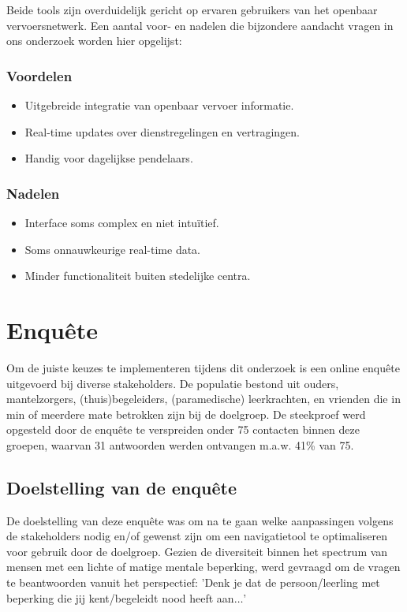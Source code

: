 Beide tools zijn overduidelijk gericht op ervaren gebruikers van het openbaar vervoersnetwerk. Een aantal voor- en nadelen die bijzondere aandacht vragen in ons onderzoek worden hier opgelijst:

\subsubsection*{Voordelen}
\begin{itemize}
    \item Uitgebreide integratie van openbaar vervoer informatie.
    \item Real-time updates over dienstregelingen en vertragingen.
    \item Handig voor dagelijkse pendelaars.
\end{itemize}
\subsubsection*{Nadelen}
\begin{itemize}
    \item Interface soms complex en niet intuïtief.
    \item Soms onnauwkeurige real-time data.
    \item Minder functionaliteit buiten stedelijke centra.
\end{itemize}

\section{Enquête}
\label{sec:enquete}


Om de juiste keuzes te implementeren tijdens dit onderzoek is een online enquête uitgevoerd bij diverse stakeholders. De populatie bestond uit ouders, mantelzorgers, (thuis)begeleiders, (paramedische) leerkrachten, en vrienden die in min of meerdere mate betrokken zijn bij de doelgroep. De steekproef werd opgesteld door de enquête te verspreiden onder 75 contacten binnen deze groepen, waarvan 31 antwoorden werden ontvangen m.a.w. 41\% van 75.

\subsection*{Doelstelling van de enquête}
De doelstelling van deze enquête was om na te gaan welke aanpassingen volgens de stakeholders nodig en/of gewenst zijn om een navigatietool te optimaliseren voor gebruik door de doelgroep. Gezien de diversiteit binnen het spectrum van mensen met een lichte of matige mentale beperking, werd gevraagd om de vragen te beantwoorden vanuit het perspectief: 'Denk je dat de persoon/leerling met beperking die jij kent/begeleidt nood heeft aan$\ldots$'

